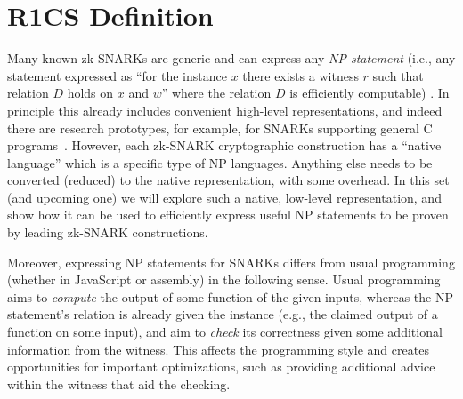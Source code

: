 \documentclass[a4paper,12pt]{article}
\begin{document}


 

\appendix

\section{R1CS Definition}\label{sec:r1cs-def}

Many known zk-SNARKs are generic and can express any \emph{NP statement} (i.e., any statement expressed as ``for the instance $x$ there exists a witness $r$ such that relation $D$ holds on $x$ and $w$'' where the relation $D$ is efficiently computable) \cite{ZKProofSecurity}. In principle this already includes convenient high-level representations, and indeed there are research prototypes, for example, for SNARKs supporting general C programs~\cite{BCGTV13csnark-crypto}. However, each zk-SNARK cryptographic construction has a ``native language'' which is a specific type of NP languages. Anything else needs to be converted (reduced) to the native representation, with some overhead. In this set (and upcoming one) we will explore such a native, low-level representation, and show how it can be used to efficiently express useful NP statements to be proven by leading zk-SNARK constructions.

Moreover, expressing NP statements for SNARKs differs from usual programming (whether in JavaScript or assembly) in the following sense. Usual programming aims to \emph{compute} the output of some function of the given inputs, whereas the NP statement's relation is already given the instance (e.g., the claimed output of a function on some input), and aim to \emph{check} its correctness given some additional information from the witness. This affects the programming style and creates opportunities for important optimizations, such as providing additional advice within the witness that aid the checking.

\end{document}
